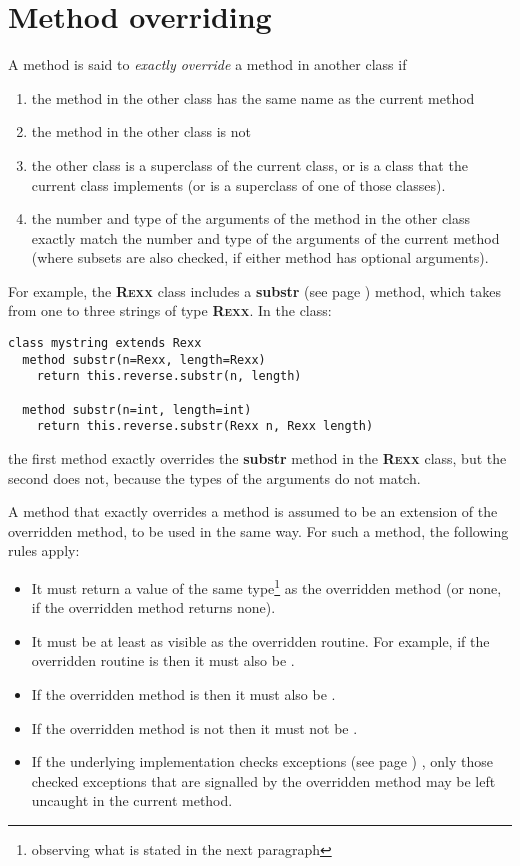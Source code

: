 \section{Method overriding}\label{refoverrid}
 
A method is said to \emph{exactly override} a method in another class
if
\begin{enumerate}
\item the method in the other class has the same name as the current method
\item the method in the other class is not 
\item the other class is a superclass of the current class, or is a class
that the current class implements (or is a superclass of one of those
classes).
\item the number and type of the arguments of the method in the other
class exactly match the number and type of the arguments of the current
method (where subsets are also checked, if either method has optional
arguments).
\end{enumerate}
For example, the \textbf{R\textsc{exx}} class includes a
 \textbf{substr} (see page \pageref{refsubstr})  method, which takes from one to
three strings of type \textbf{R\textsc{exx}}.  In the class:
\begin{lstlisting}
class mystring extends Rexx
  method substr(n=Rexx, length=Rexx)
    return this.reverse.substr(n, length)

  method substr(n=int, length=int)
    return this.reverse.substr(Rexx n, Rexx length)
\end{lstlisting}
the first method exactly overrides the \textbf{substr} method in
the \textbf{R\textsc{exx}} class, but the second does not, because the types of
the arguments do not match.
 
A method that exactly overrides a method is assumed to be an extension
of the overridden method, to be used in the same way.  For such a
method, the following rules apply:
\begin{itemize}
\item It must return a value of the same type\footnote{observing what
    is stated in the next paragraph} as the overridden method (or
none, if the overridden method returns none).
\item It must be at least as visible as the overridden routine.
For example, if the overridden routine is  then it must
also be .
\item If the overridden method is  then it must also
be .
\item If the overridden method is not  then it must
not be .
\item If the underlying implementation checks  exceptions (see page \pageref{refexcep}) ,
only those checked exceptions that are signalled by the overridden
method may be left uncaught in the current method.
\end{itemize}

